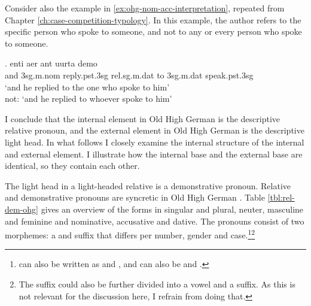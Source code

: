 Consider also the example in \ref{ex:ohg-nom-acc-interpretation}, repeated from Chapter \ref{ch:case-competition-typology}.
In this example, the author refers to the specific person who spoke to someone, and not to any or every person who spoke to someone.

\exg. enti aer {ant uurta} demo  \\
and 3\ac{sg}.\ac{m}.\ac{nom} reply.\ac{pst}.3\ac{sg}\scsub{[dat]} \ac{rel}.\ac{sg}.\ac{m}.\ac{dat} {to 3\ac{sg}.\ac{m}.\ac{dat}} speak.\ac{pst}.3\ac{sg}\scsub{[nom]}\\
`and he replied to the one who spoke to him'\\
not: `and he replied to whoever spoke to him'
 \label{ex:ohg-dat-nom-rep}

I conclude that the internal element in Old High German is the descriptive relative pronoun, and the external element in Old High German is the descriptive light head. In what follows I closely examine the internal structure of the internal and external element. I illustrate how the internal base and the external base are identical, so they contain each other.

The light head in a light-headed relative is a demonstrative pronoun. Relative and demonstrative pronouns are syncretic in Old High German . Table \ref{tbl:rel-dem-ohg} gives an overview of the forms in singular and plural, neuter, masculine and feminine and nominative, accusative and dative. The pronouns consist of two morphemes: a  and suffix that differs per number, gender and case.\footnote{
 can also be written as  and ,  and  can also be  and  .
}\footnote{
The suffix could also be further divided into a vowel and a suffix. As this is not relevant for the discussion here, I refrain from doing that.
}

